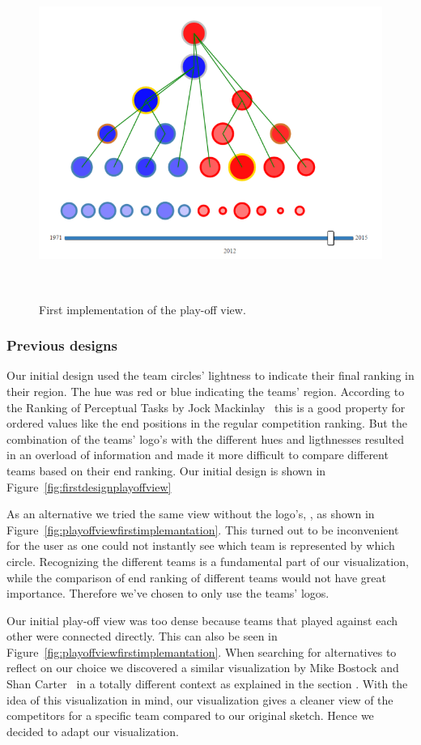 \documentclass[]{sigchi}
\begin{document}
\begin{figure}
\centering
  \includegraphics[width=0.9\columnwidth]{figures/playoffviewfirstimplemantation}
  \caption{First implementation of the play-off view.}~\label{fig:firstimplementationplayoffview}
\end{figure}


\subsubsection{Previous designs}
Our initial design used the team circles' lightness to indicate their final
ranking in their region. The hue was red or blue indicating the teams' region.
According to the Ranking of Perceptual Tasks by Jock Mackinlay~\cite{automatingdesign} this is a good property for ordered values like the end positions in the regular competition ranking. But the combination of the teams' logo's with the different hues and ligthnesses resulted in an overload of information and made it more difficult to compare different teams based on their end ranking. Our initial design is shown in Figure~\ref{fig:firstdesignplayoffview}

As an alternative we tried the same view without the logo's, , as shown in Figure~\ref{fig:playoffviewfirstimplemantation}. This turned out to be inconvenient for the user as one could not instantly see which team is represented by which circle. Recognizing the different teams is a fundamental part of our visualization, while the comparison of end ranking of different teams would not have great importance. Therefore we've chosen to only use the teams' logos.

Our initial play-off view was too dense because teams that played against each other were connected directly. This can also be seen in Figure~\ref{fig:playoffviewfirstimplemantation}. When searching for alternatives to reflect on our choice we discovered a similar visualization by Mike Bostock and Shan Carter~\cite{whitehousepath} in a totally different context as explained in the section . With the idea of this visualization in mind, our visualization gives a cleaner view of the competitors for a specific team compared to our original sketch. Hence we decided to adapt our visualization.
\end{document}
